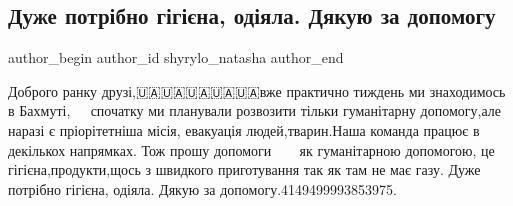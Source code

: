  
 
 
 
 
 
\subsection{Дуже потрібно гігієна, одіяла. Дякую за допомогу}
\label{sec:16_12_2022.fb.shyrylo_natasha.1.gigiena_odijala_dopomoga}
 
\ifcmt
 author_begin
   author_id shyrylo_natasha
 author_end
\fi

Доброго ранку друзі,🇺🇦🇺🇦🇺🇦🇺🇦🇺🇦вже практично тиждень ми знаходимось в
Бахмуті,🥺😱🫣🤯 спочатку ми планували розвозити тільки гуманітарну допомогу,але
наразі є пріорітетніша місія, евакуація людей,тварин.Наша команда працює в
декількох напрямках. Тож прошу допомоги🙏🙏🙏🙏🙏🙏 як гуманітарною допомогою,
це гігієна,продукти,щось з швидкого приготування так як там не має газу. Дуже
потрібно гігієна, одіяла. Дякую за допомогу.4149499993853975.

